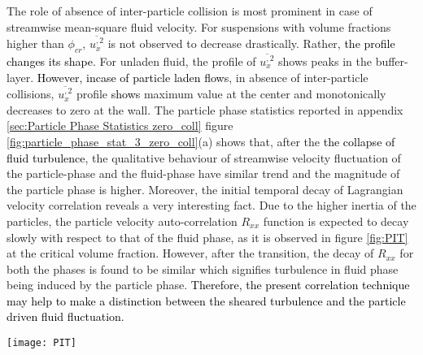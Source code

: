 \documentclass[aip,graphicx]{revtex4-1}
\begin{document}
    The role of absence of inter-particle collision is most prominent in case of streamwise mean-square fluid velocity. For suspensions with volume fractions higher than $\phi_{cr}$, $\overline{u_x^{,2}}$ is not observed to decrease drastically. Rather, \textcolor{black}{the profile changes its shape}. For unladen fluid, the profile of $\overline{u_x^{,2}}$ shows peaks in the buffer-layer. \textcolor{black}{However, incase of particle laden flows}, in absence of inter-particle collisions, $\overline{u_x^{,2}}$ profile \textcolor{black}{shows} maximum value at the center and monotonically decreases to zero at the wall. The particle phase statistics reported in appendix \ref{sec:Particle Phase Statistics zero_coll} figure  \ref{fig:particle_phase_stat_3_zero_coll}(a) shows that, after the \textcolor{black}{the collapse of fluid turbulence}, the qualitative behaviour of streamwise velocity fluctuation of the particle-phase and the fluid-phase have similar trend and the magnitude of the particle phase is higher. Moreover, the initial temporal decay of Lagrangian velocity correlation reveals a very interesting fact. Due to the higher inertia of the particles, the particle velocity auto-correlation $R_{xx}$ function is expected to decay slowly with respect to that of the fluid phase, as it is observed in figure \ref{fig:PIT} at the critical volume fraction. However, after the transition, the decay of $R_{xx}$ for both the phases is found to be similar which signifies turbulence in fluid phase being induced by the particle phase. \textcolor{black}{Therefore, the present correlation technique may help to make a distinction between the sheared turbulence and the particle driven fluid fluctuation.} 
    \begin{figure*}[h!]
    \centering
    \texttt{[image: PIT]}
    \caption{The initial decay of the temporal Lagrangian streamwise velocity auto-correlation $R_{xx}$ of the fluid and the particle phase before and after the transition in turbulence in absence of inter-particle collision computed in the zone $y/\delta:0.6-1.0$}
    \label{fig:PIT}
    \end{figure*}
\end{document}
